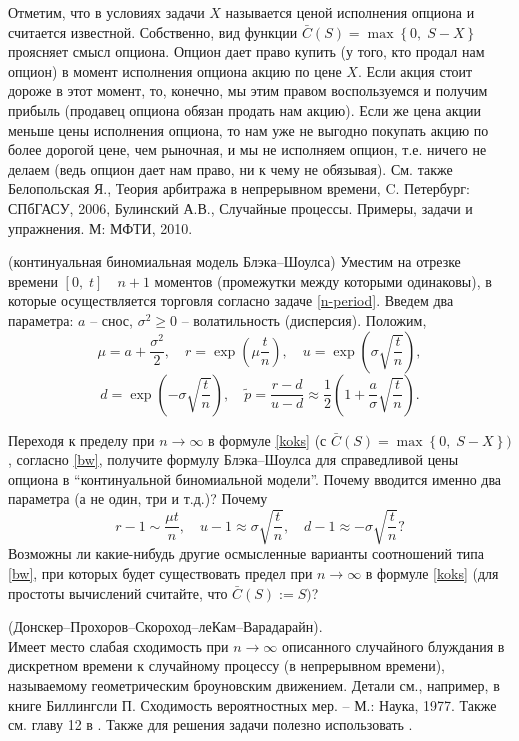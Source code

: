 \begin{remark}
Отметим, что в условиях задачи $X$ называется ценой исполнения опциона и считается 
известной. Собственно, вид функции $\bar {C}\left( S \right)=\max \left\{ 
{0,\;S-X} \right\}$ проясняет смысл опциона. Опцион дает право купить (у 
того, кто продал нам опцион) в момент исполнения опциона акцию по цене $X$. 
Если акция стоит дороже в этот момент, то, конечно, мы этим правом 
воспользуемся и получим прибыль (продавец опциона обязан продать нам акцию). 
Если же цена акции меньше цены исполнения опциона, то нам уже не выгодно 
покупать акцию по более дорогой цене, чем рыночная, и мы не исполняем 
опцион, т.е. ничего не делаем (ведь опцион дает нам право, ни к чему не 
обязывая). См. также Белопольская Я., Теория арбитража в непрерывном времени, C. Петербург: СПбГАСУ, 2006, Булинский А.В., Случайные процессы. Примеры, задачи и упражнения. М: МФТИ, 2010.
\end{remark}
\begin{problem}(континуальная биномиальная модель Блэка--Шоулса) 
\label{bw-cont}
Уместим на отрезке времени $\left[ {0,\;t} \right] \quad n+1$  моментов 
(промежутки между которыми одинаковы), в которые осуществляется торговля 
согласно задаче \ref{n-period}. Введем два параметра: $a$ -- снос, $\sigma ^2\ge 0$ -- 
волатильность (дисперсия). Положим,
\[
\mu =a+\frac{\sigma ^2}{2},
\quad
r=\exp \left( {\mu \frac{t}{n}} \right),
\quad
u=\exp \left( {\sigma \sqrt {\frac{t}{n}} } \right),
\]
\begin{equation}
\label{bw}
d=\exp \left( {-\sigma \sqrt {\frac{t}{n}} } \right),
\quad
\tilde {p}=\frac{r-d}{u-d}\approx \frac{1}{2}\left( {1+\frac{a}{\sigma 
}\sqrt {\frac{t}{n}} } \right).
\end{equation}

Переходя к пределу при $n\to \infty $ в формуле \eqref{koks} (с $\bar {C}\left( S 
\right)=\max\left\{ {0,\;S-X} \right\})$, согласно \eqref{bw}, получите формулу 
Блэка--Шоулса для справедливой цены опциона в ``континуальной биномиальной 
модели''. Почему вводится именно два параметра (а не один, три и т.д.)? 
Почему
\[
r-1\sim \frac{\mu t}{n},
\quad
u-1\approx \sigma \sqrt {\frac{t}{n}} ,
\quad
d-1\approx -\sigma \sqrt {\frac{t}{n}} ?
\]
Возможны ли какие-нибудь другие осмысленные варианты соотношений типа \eqref{bw}, 
при которых будет существовать предел при $n\to \infty $ в формуле \eqref{koks} (для 
простоты вычислений считайте, что $\bar {C}\left( S \right):=S)$?
\end{problem}
\begin{remark} (Донскер--Прохоров--Скороход--леКам--Варадарайн). \\
Имеет место слабая сходимость при $n\to \infty $ описанного случайного 
блуждания в дискретном времени к случайному процессу (в непрерывном 
времени), называемому геометрическим броуновским движением. Детали см., 
например, в книге Биллингсли П. Сходимость вероятностных мер. -- М.: Наука, 
1977. Также см. главу 12 в \cite{Gupta}. Также для решения задачи полезно использовать \cite{101}.
\end{remark}
